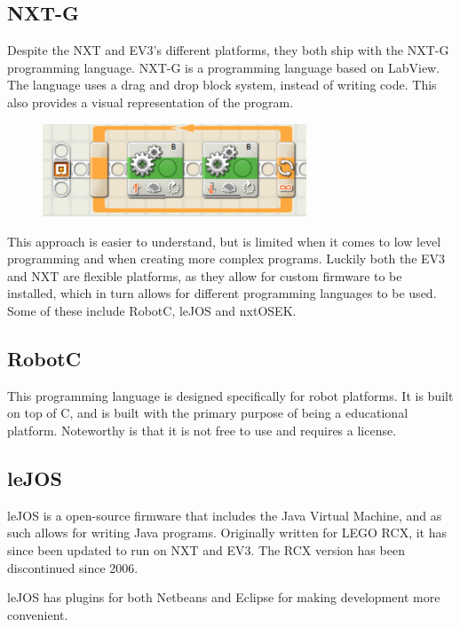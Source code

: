 \subsection*{NXT-G}
Despite the NXT and EV3's different platforms, they both ship with the NXT-G programming language. NXT-G is a programming language based on LabView\cite{LabView}. The language uses a drag and drop block system, instead of writing code. This also provides a visual representation of the program.

\begin{figure}[H]
    \centering
    \includegraphics[width=0.7\textwidth]{Images/Software/Mindstorms/mindstorms_block.png}
\end{figure}

This approach is easier to understand, but is limited when it comes to low level programming and when creating more complex programs. Luckily both the EV3 and NXT are flexible platforms, as they allow for custom firmware to be installed, which in turn allows for different programming languages to be used.
Some of these include RobotC\cite{RobotC}, leJOS\cite{leJOS} and nxtOSEK\cite{nxtOSEK}.

\subsection*{RobotC}
This programming language is designed specifically for robot platforms. It is built on top of C, and is built with the primary purpose of being a educational platform. Noteworthy is that it is not free to use and requires a license.

\subsection*{leJOS}
leJOS is a open-source firmware that includes the Java Virtual Machine\cite{Java}, and as such allows for writing Java programs. Originally written for LEGO RCX, it has since been updated to run on NXT and EV3. The RCX version has been discontinued since 2006.

leJOS has plugins for both Netbeans\cite{Netbeans} and Eclipse\cite{Eclipse} for making development more convenient.

